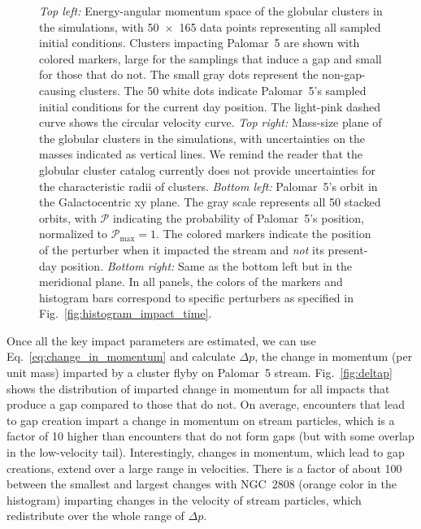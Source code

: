 \begin{figure}
            \caption[Dynamical and internal characteristics of the perturbers]{\textit{Top left:} Energy-angular momentum space of the globular clusters in the simulations, with 50~$\times$~165 data points representing all sampled initial conditions. Clusters impacting Palomar~5 are shown with colored markers, large for the samplings that induce a gap and small for those that do not. The small gray dots represent the non-gap-causing clusters. The 50 white dots indicate Palomar~5's sampled initial conditions for the current day position. The light-pink dashed curve shows the circular velocity curve. \textit{Top right:} Mass-size plane of the globular clusters in the simulations, with uncertainties on the masses indicated as vertical lines. We remind the reader that the globular cluster catalog currently does not provide uncertainties for the characteristic radii of clusters. \textit{Bottom left:} Palomar~5's orbit in the Galactocentric xy plane. The gray scale represents all 50 stacked orbits, with $\mathcal{P}$ indicating the probability of Palomar~5's position, normalized to $\mathcal{P}_\mathrm{max}=1$. The colored markers indicate the position of the perturber when it impacted the stream and \textit{not} its present-day position. \textit{Bottom right:} Same as the bottom left but in the meridional plane. In all panels, the colors of the markers and histogram bars correspond to specific perturbers as specified in Fig.~\ref{fig:histogram_impact_time}.}
            \label{fig:mass_size_plane}
        \end{figure}        
      
        Once all the key impact parameters are estimated, we can use Eq.~\ref{eq:change_in_momentum} and calculate $\Delta p$, the change in momentum (per unit mass) imparted by a cluster flyby on Palomar~5 stream. Fig.~\ref{fig:deltap} shows the distribution of imparted change in momentum for all impacts that produce a gap compared to those that do not. On average, encounters that lead to gap creation impart a change in momentum on stream particles, which is a factor of 10 higher than encounters that do not form gaps (but with some overlap in the low-velocity tail). Interestingly, changes in momentum, which lead to gap creations, extend over a large range in velocities. There is a factor of about 100 between the smallest and largest changes with NGC~2808 (orange color in the histogram) imparting changes in the velocity of stream particles, which redistribute over the whole range of $\Delta p$. 

